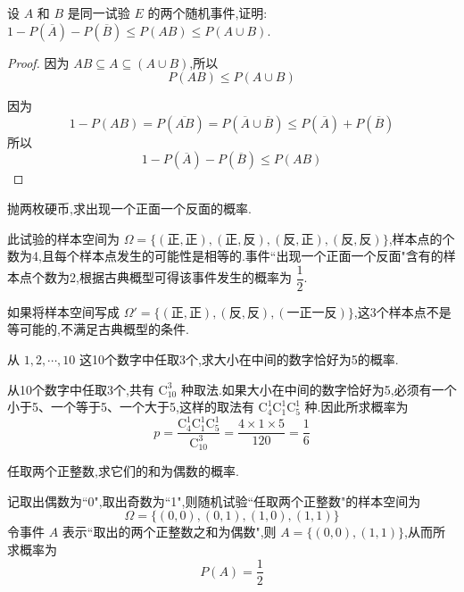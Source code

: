 \question 设 $A$ 和 $B$ 是同一试验 $E$ 的两个随机事件,证明: $1 - P(\overline{A}) - P(\overline{B}) \leqslant P(AB) \leqslant P(A \cup B)$.

\begin{proof}
    因为 $AB \subseteq A \subseteq (A \cup B)$,所以
    $$
    P(AB) \leqslant P(A \cup B)
    $$

    因为
    $$
    1 - P(AB) = P(\overline{AB}) = P(\overline{A} \cup \overline{B}) \leqslant P(\overline{A}) + P(\overline{B})
    $$
    所以
    $$
    1 - P(\overline{A}) - P(\overline{B}) \leqslant P(AB)
    $$
\end{proof}

\question 抛两枚硬币,求出现一个正面一个反面的概率.

\begin{solution}
    此试验的样本空间为 $\varOmega = \{ (\text{正}, \text{正}), (\text{正}, \text{反}), (\text{反}, \text{正}), (\text{反}, \text{反}) \}$,样本点的个数为4,且每个样本点发生的可能性是相等的.事件``出现一个正面一个反面"含有的样本点个数为2,根据古典概型可得该事件发生的概率为 $\dfrac{1}{2}$.
\end{solution}

\begin{note}
    \indent 如果将样本空间写成 $\varOmega' = \{ (\text{正}, \text{正}), (\text{反}, \text{反}), (\text{一正一反}) \}$,这3个样本点不是等可能的,不满足古典概型的条件.
\end{note}

\question 从 $1,2,\cdots,10$ 这10个数字中任取3个,求大小在中间的数字恰好为5的概率.

\begin{solution}
    从10个数字中任取3个,共有 $\mathrm{C}_{10}^3$ 种取法.如果大小在中间的数字恰好为5,必须有一个小于5、一个等于5、一个大于5,这样的取法有 $\mathrm{C}_4^1 \mathrm{C}_1^1 \mathrm{C}_5^1$ 种.因此所求概率为
    $$
    p = \dfrac{\mathrm{C}_4^1 \mathrm{C}_1^1 \mathrm{C}_5^1}{\mathrm{C}_{10}^3} = \dfrac{4 \times 1 \times 5}{120} = \dfrac{1}{6}
    $$
\end{solution}

\question 任取两个正整数,求它们的和为偶数的概率.

\begin{solution}
    记取出偶数为``0",取出奇数为``1",则随机试验``任取两个正整数"的样本空间为
    $$
    \varOmega = \{ (0,0), (0,1), (1,0), (1,1) \}
    $$
    令事件 $A$ 表示``取出的两个正整数之和为偶数",则 $A = \{ (0,0), (1,1) \}$,从而所求概率为 $$P(A) = \dfrac{1}{2}$$
\end{solution}

